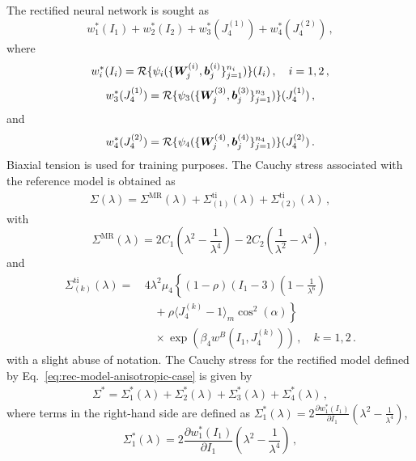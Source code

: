 The rectified neural network is sought as
\begin{equation}\label{eq:rec-model-anisotropic-case}
    w_1^*(I_1) + w_2^*(I_2) + w_3^*(J_4^{(1)}) + w_4^*(J_4^{(2)})\,,
\end{equation}
where
\begin{equation}
    w_i^*(I_i) = \mathcal{R}\{\psi_i(\{\boldsymbol{W}_j^{(i)}, \boldsymbol{b}_j^{(i)}\}_{j = 1}^{n_i})\}(I_i)\,,\quad i=1,2\,,
\end{equation}
\begin{align}
    w_{3}^*(J_4^{(1)}) = \mathcal{R}\{\psi_3(\{\boldsymbol{W}_j^{(3)}, \boldsymbol{b}_j^{(3)}\}_{j = 1}^{n_3})\}(J_4^{(1)})\,,
\end{align}
and
\begin{align}
    w_{4}^*(J_4^{(2)}) = \mathcal{R}\{\psi_4(\{\boldsymbol{W}_j^{(4)}, \boldsymbol{b}_j^{(4)}\}_{j = 1}^{n_4})\}(J_4^{(2)})\,.
\end{align}
Biaxial tension is used for training purposes. The Cauchy stress associated with the reference model is obtained as
\begin{align}
     \Sigma(\lambda) = \Sigma^{\text{MR}}(\lambda) + \Sigma_{(1)}^{\text{ti}} (\lambda) + \Sigma_{(2)}^{\text{ti}} (\lambda)\,,
\end{align}
with
\begin{equation}
    \Sigma^{\text{MR}}(\lambda) = 2C_1(\lambda^2 - \frac{1}{\lambda^4}) - 2C_2(\frac{1}{\lambda^2} - \lambda^4)\,,
\end{equation}
and
\begin{align}
    \Sigma^{\text{ti}}_{(k)}(\lambda) = & \, 4 \lambda^2 \mu_4 \left\{ (1-\rho)(I_1 - 3)\left(1 - \frac{1}{\lambda^6}\right) \right.  \nonumber \\
    & \quad + \left. \rho \langle J_4^{(k)} - 1 \rangle_m \cos^2(\alpha) \right\}  \nonumber\\
    &\quad \times \exp(\beta_4 w^B(I_1, J_4^{(k)}))\,, \quad k = 1,2\,.
\end{align}
with a slight abuse of notation. The Cauchy stress for the rectified model defined by Eq.~\eqref{eq:rec-model-anisotropic-case} is given by
\begin{align}\label{eq:ANI_Cauchy}
    \Sigma^{*} = \Sigma^*_1(\lambda) + \Sigma^*_2(\lambda) +  \Sigma^*_3(\lambda) + \Sigma^*_4(\lambda)\,,
\end{align}
where terms in the right-hand side are defined as $\Sigma^*_1(\lambda) = 2 \frac{\partial w_1^*(I_1)}{\partial I_1} \left( \lambda^2 - \frac{1}{\lambda^4} \right)$, 
\begin{equation}
    \Sigma^*_1(\lambda) = 2 \frac{\partial w_1^*(I_1)}{\partial I_1} \left( \lambda^2 - \frac{1}{\lambda^4} \right)\,, 
\end{equation}
